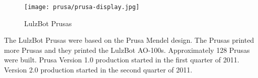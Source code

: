 %
%
%
%
%

\begin{figure}[h!]
\texttt{[image: prusa/prusa-display.jpg]}
 \caption{LulzBot Prusas}
 \label{fig:prusa-display}
\end{figure}

The LulzBot Prusas were based on the Prusa Mendel design. The Prusas
printed more Prusas and they printed the LulzBot AO-100s. Approximately
128 Prusas were built. Prusa Version 1.0 production started in the first
quarter of 2011. Version 2.0 production started in the second quarter of 2011.





